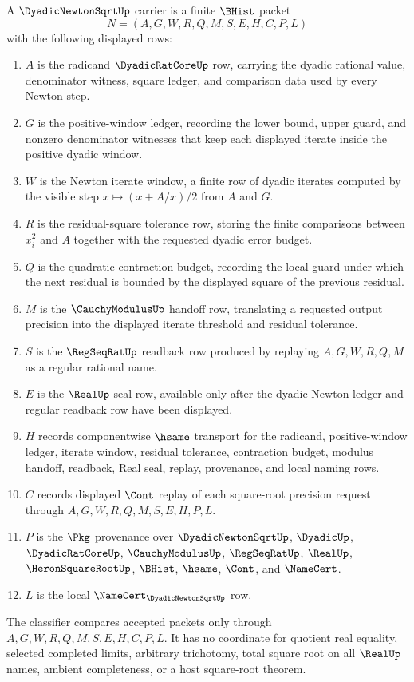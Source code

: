 \begin{definition}
\label{def:dyadic-newton-sqrt-carrier}
A $\DyadicNewtonSqrtUp$ carrier is a finite $\BHist$ packet
$$
N=(A,G,W,R,Q,M,S,E,H,C,P,L)
$$
with the following displayed rows:
\begin{enumerate}
\item $A$ is the radicand $\DyadicRatCoreUp$ row, carrying the dyadic rational value, denominator witness, square ledger, and comparison data used by every Newton step.
\item $G$ is the positive-window ledger, recording the lower bound, upper guard, and nonzero denominator witnesses that keep each displayed iterate inside the positive dyadic window.
\item $W$ is the Newton iterate window, a finite row of dyadic iterates computed by the visible step $x\mapsto (x+A/x)/2$ from $A$ and $G$.
\item $R$ is the residual-square tolerance row, storing the finite comparisons between $x_i^2$ and $A$ together with the requested dyadic error budget.
\item $Q$ is the quadratic contraction budget, recording the local guard under which the next residual is bounded by the displayed square of the previous residual.
\item $M$ is the $\CauchyModulusUp$ handoff row, translating a requested output precision into the displayed iterate threshold and residual tolerance.
\item $S$ is the $\RegSeqRatUp$ readback row produced by replaying $A,G,W,R,Q,M$ as a regular rational name.
\item $E$ is the $\RealUp$ seal row, available only after the dyadic Newton ledger and regular readback row have been displayed.
\item $H$ records componentwise $\hsame$ transport for the radicand, positive-window ledger, iterate window, residual tolerance, contraction budget, modulus handoff, readback, Real seal, replay, provenance, and local naming rows.
\item $C$ records displayed $\Cont$ replay of each square-root precision request through $A,G,W,R,Q,M,S,E,H,P,L$.
\item $P$ is the $\Pkg$ provenance over $\DyadicNewtonSqrtUp$, $\DyadicUp$, $\DyadicRatCoreUp$, $\CauchyModulusUp$, $\RegSeqRatUp$, $\RealUp$, $\HeronSquareRootUp$, $\BHist$, $\hsame$, $\Cont$, and $\NameCert$.
\item $L$ is the local $\NameCert_{\DyadicNewtonSqrtUp}$ row.
\end{enumerate}
The classifier compares accepted packets only through $A,G,W,R,Q,M,S,E,H,C,P,L$. It has no coordinate for quotient real equality, selected completed limits, arbitrary trichotomy, total square root on all $\RealUp$ names, ambient completeness, or a host square-root theorem.
\end{definition}

